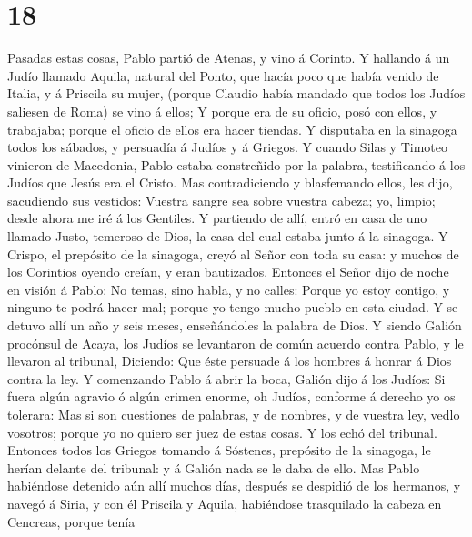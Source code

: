 \hypertarget{section-17}{%
\section{18}\label{section-17}}

 Pasadas estas cosas, Pablo partió de Atenas, y vino á
Corinto.  Y hallando á un Judío llamado Aquila, natural del
Ponto, que hacía poco que había venido de Italia, y á Priscila su mujer,
(porque Claudio había mandado que todos los Judíos saliesen de Roma) se
vino á ellos;  Y porque era de su oficio, posó con ellos, y
trabajaba; porque el oficio de ellos era hacer tiendas.  Y
disputaba en la sinagoga todos los sábados, y persuadía á Judíos y á
Griegos.  Y cuando Silas y Timoteo vinieron de Macedonia,
Pablo estaba constreñido por la palabra, testificando á los Judíos que
Jesús era el Cristo.  Mas contradiciendo y blasfemando
ellos, les dijo, sacudiendo sus vestidos: Vuestra sangre sea sobre
vuestra cabeza; yo, limpio; desde ahora me iré á los Gentiles.
 Y partiendo de allí, entró en casa de uno llamado Justo,
temeroso de Dios, la casa del cual estaba junto á la sinagoga.
 Y Crispo, el prepósito de la sinagoga, creyó al Señor con
toda su casa: y muchos de los Corintios oyendo creían, y eran
bautizados.  Entonces el Señor dijo de noche en visión á
Pablo: No temas, sino habla, y no calles:  Porque yo estoy
contigo, y ninguno te podrá hacer mal; porque yo tengo mucho pueblo en
esta ciudad.  Y se detuvo allí un año y seis meses,
enseñándoles la palabra de Dios.  Y siendo Galión procónsul
de Acaya, los Judíos se levantaron de común acuerdo contra Pablo, y le
llevaron al tribunal,  Diciendo: Que éste persuade á los
hombres á honrar á Dios contra la ley.  Y comenzando Pablo
á abrir la boca, Galión dijo á los Judíos: Si fuera algún agravio ó
algún crimen enorme, oh Judíos, conforme á derecho yo os tolerara:
 Mas si son cuestiones de palabras, y de nombres, y de
vuestra ley, vedlo vosotros; porque yo no quiero ser juez de estas
cosas.  Y los echó del tribunal.  Entonces
todos los Griegos tomando á Sóstenes, prepósito de la sinagoga, le
herían delante del tribunal: y á Galión nada se le daba de ello.
 Mas Pablo habiéndose detenido aún allí muchos días,
después se despidió de los hermanos, y navegó á Siria, y con él Priscila
y Aquila, habiéndose trasquilado la cabeza en Cencreas, porque tenía
